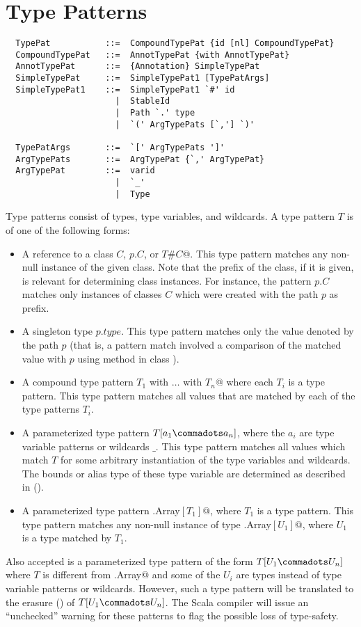 
\section{Type Patterns}\label{sec:type-patterns}

\syntax\begin{lstlisting}
  TypePat           ::=  CompoundTypePat {id [nl] CompoundTypePat}
  CompoundTypePat   ::=  AnnotTypePat {with AnnotTypePat}
  AnnotTypePat      ::=  {Annotation} SimpleTypePat
  SimpleTypePat     ::=  SimpleTypePat1 [TypePatArgs]
  SimpleTypePat1    ::=  SimpleTypePat1 `#' id
                      |  StableId 
                      |  Path `.' type
                      |  `(' ArgTypePats [`,'] `)'
 
  TypePatArgs       ::=  `[' ArgTypePats ']'
  ArgTypePats       ::=  ArgTypePat {`,' ArgTypePat}
  ArgTypePat        ::=  varid 
                      |  `_' 
                      |  Type
\end{lstlisting}
Type patterns consist of types, type variables, and wildcards. 
A type pattern $T$ is of one of the following  forms:
\begin{itemize}
\item A reference to a class $C$, $p.C$, or \lstinline@$T$#$C$@.  This
type pattern matches any non-null instance of the given class. Note that
the prefix of the class, if it is given, is relevant for determining
class instances. For instance, the pattern $p.C$ matches only
instances of classes $C$ which were created with the path $p$ as
prefix.
\item
A singleton type $p.type$. This type pattern matches only the value
denoted by the path $p$ (that is, a pattern match involved a
comparison of the matched value with $p$ using method  in class
).
\item
A compound type pattern \lstinline@$T_1$ with $\ldots$ with $T_n$@ where each $T_i$ is a
type pattern. This type pattern matches all values that are matched by each of
the type patterns $T_i$.
\item 
A parameterized type pattern $T[a_1 \commadots a_n]$, where the $a_i$
are type variable patterns or wildcards $\_$. 
This type pattern matches all values which match $T$ for
some arbitrary instantiation of the type variables and wildcards. The
bounds or alias type of these type variable are determined as
described in ().
\item
A parameterized type pattern \lstinline@scala.Array$[T_1]$@, where
$T_1$ is a type pattern. This type pattern matches any non-null instance
of type \lstinline@scala.Array$[U_1]$@, where $U_1$ is a type matched by $T_1$.
\end{itemize}
Also accepted is a parameterized type pattern of the form $T[U_1
\commadots U_n]$ where $T$ is different from \lstinline@scala.Array@
and some of the $U_i$ are types instead of type variable patterns or
wildcards. However, such a type pattern will be translated to the
erasure () of $T[U_1 \commadots U_n]$.  The Scala
compiler will issue an ``unchecked'' warning for these patterns to
flag the possible loss of type-safety.

